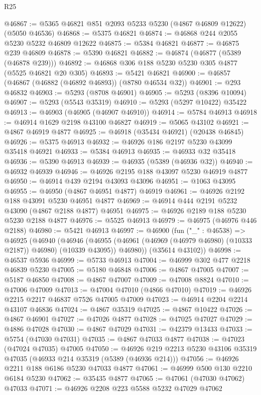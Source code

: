 \begin{lexlean}{R25}
\begin{coremodule}
@46867 := @5365 @46821 @851 @2093 @5233 @5230 (@4867 @46809 @12622) (@5050 @46536)
@46868 := @5375 @46821
@46874 := @46868 @244 @2055 @5230 @5232 @46809 @12622
@46875 := @5384 @46821
@46877 := @46875 @239 @46809
@46878 := @5390 @46821
@46882 := @46874 (@46877 (@5389 (@46878 @239)))
@46892 := @46868 @306 @188 @5230 @5230 @305 @4877 (@5525 @46821 @20 @305)
@46893 := @5421 @46821
@46900 := @46857 (@46867 (@46882 (@46892 @46893)) (@8780 @46534 @32))
@46901 := @293 @46832
@46903 := @5293 (@8708 @46901)
@46905 := @5293 (@8396 @10094)
@46907 := @5293 (@5543 @35319)
@46910 := @5293 (@5297 @10422) @35422
@46913 := @46903 (@46905 (@46907 @46910))
@46914 := @5784 @46913
@46918 := @46914 @1629 @2198 @43100 @46827
@46919 := @5065 @43102
@46921 := @4867 @46919 @4877
@46925 := @46918 (@35434 @46921) (@20438 @46845)
@46926 := @5375 @46913
@46932 := @46926 @186 @2197 @5230 @43099 @35418 @46921
@46933 := @5384 @46913
@46935 := @46933 @32 @35418
@46936 := @5390 @46913
@46939 := @46935 (@5389 (@46936 @32))
@46940 := @46932 @46939
@46946 := @46926 @2195 @188 @43097 @5230 @46919 @4877
@46950 := @46914 @439 @2194 @43093 @43096
@46951 := @1063 @43095
@46955 := @46950 (@4867 @46951 @4877) @46919
@46961 := @46926 @2192 @188 @43091 @5230 @46951 @4877
@46969 := @46914 @444 @2191 @5232 @43090 (@4867 @2188 @4877) @46951
@46975 := @46926 @2189 @188 @5230 @5230 @2188 @4877
@46976 := @5525 @46913
@46979 := @46975 (@46976 @446 @2188)
@46980 := @5421 @46913
@46997 := @46900
    (fun ("_" : @46538) =>
    @46925
      (@46940
        (@46946
          (@46955 (@46961 (@46969 (@46979 @46980) (@10333 @2187)) @46980) (@10339 @43095))
          @46980))
      (@35614 @43102))
@46998 := @46537 @5936
@46999 := @5733 @46913
@47004 := @46999 @302 @477 @2218 @46839 @5230
@47005 := @5180 @46848
@47006 := @4867 @47005
@47007 := @5187 @46850
@47008 := @4867 @47007
@47009 := @47008 @8824
@47010 := @47006 @47009
@47013 := @47004 @47010 (@4866 @47010)
@47019 := @46926 @2215 @2217 @46837 @7526 @47005 @47009
@47023 := @46914 @2204 @2214 @43107 @46836
@47024 := @4867 @35319
@47025 := @4867 @10422
@47026 := @4867 @46901
@47027 := @47026 @4877
@47028 := @47025 @47027
@47029 := @4886 @47028
@47030 := @4867 @47029
@47031 := @42379 @13433
@47033 := @5754 (@47030 @47031)
@47035 := @4867 @47033 @4877
@47038 := @47023 (@47024 @47035) @47005
@47050 := @46926 @219 @2213 @5230 @43106 @35319 @47035 (@46933 @214 @35319 (@5389 (@46936 @214)))
@47056 := @46926 @2211 @188 @6186 @5230 @47033 @4877
@47061 := @46999 @500 @130 @2210 @6184 @5230
@47062 := @35435 @4877
@47065 := @47061 (@47030 @47062) @47033
@47071 := @46926 @2208 @223 @5588 @5232 @47029 @47062

\end{coremodule}
\end{lexlean}
